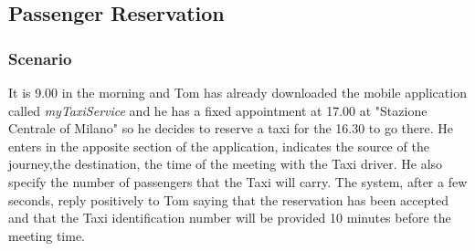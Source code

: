 \subsection{Passenger Reservation}
\subsubsection{Scenario}
It is 9.00 in the morning and Tom has already downloaded the mobile application called \textit{myTaxiService} and he has a fixed appointment at 17.00 at "Stazione Centrale of Milano" so he decides to reserve a taxi for the 16.30 to go there. He enters in the apposite section of the application, indicates the source of the journey,the destination, the time of the meeting with the Taxi driver. He also specify the number of passengers that the Taxi will carry. The system, after a few seconds, reply positively to Tom saying that the reservation has been accepted and that the Taxi identification number will be provided 10 minutes before the meeting time.

